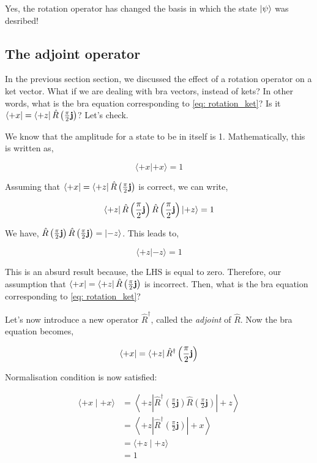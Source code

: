 Yes, the rotation operator has changed the basis in which the state $\ket{\psi}$
was desribed!

\subsection{The adjoint operator}
In the previous section section, we discussed the effect of a rotation operator
on a ket vector. What if we are dealing with bra vectors, instead of kets? In 
other words, what is the bra equation corresponding to \cref{eq: rotation_ket}?
Is it $\bra{+x} = \bra{+z} \hat R \left(\frac{\pi}{2} \mathbf{j} \right)$? Let's
check.

We know that the amplitude for a state to be in itself is 1. Mathematically, this
is written as,

\begin{equation}
\langle +x | +x \rangle = 1 \nonumber
\end{equation}

Assuming that $\bra{+x} = \bra{+z} \hat R \left(\frac{\pi}{2} \mathbf{j} \right)$ is
correct, we can write,

\begin{equation}
\bra{+z} \hat R \left(\frac{\pi}{2} \mathbf{j} \right) 
\hat R \left(\frac{\pi}{2} \mathbf{j} \right)\ket{+z} = 1
\end{equation}

We have, $\hat R \left(\frac{\pi}{2} \mathbf{j} \right) \hat R \left(\frac{\pi}{2} \mathbf{j} \right) = \ket{-z}$.
This leads to,

\begin{equation}
\langle +z | -z \rangle = 1
\end{equation}

This is an absurd result because, the LHS is equal to zero. Therefore, our assumption that
$\bra{+x} = \bra{+z} \hat R \left(\frac{\pi}{2} \mathbf{j} \right)$ is incorrect. Then, what
is the bra equation corresponding to \cref{eq: rotation_ket}?

Let's now introduce a new operator $\hat R^{\dag}$, called the \emph{adjoint} of $\hat R$.
Now the bra equation becomes,

\begin{equation}
	\bra{+x} = \bra{+z} \hat R^{\dag} \left(\frac{\pi}{2} \mathbf{j} \right) 
\end{equation}

Normalisation condition is now satisfied:

\begin{equation*}
\begin{aligned}
\langle+x \mid+x\rangle &=\left\langle+z\left|\hat{R}^{\dagger}\left(\frac{\pi}{2} \mathbf{j}\right) \hat{R}\left(\frac{\pi}{2} \mathbf{j}\right)\right|+z\right\rangle \\
%
&=\left\langle+z\left|\hat{R}^{\dagger}\left(\frac{\pi}{2} \mathbf{j}\right)\right|+x \right \rangle \\
&=\langle+z \mid+z\rangle \\
&=1
\end{aligned}
\end{equation*}

